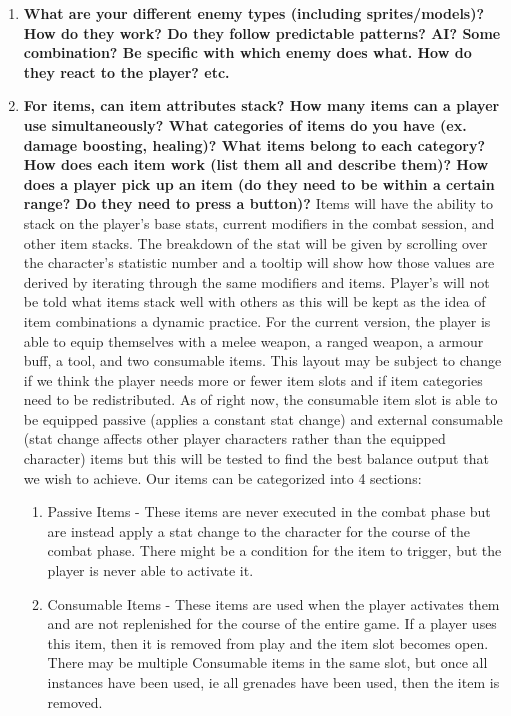 \documentclass[12pt, titlepage]{article}
\begin{document}
\begin{enumerate}
	\item \textbf{What are your different enemy types (including sprites/models)? How do they work? Do they follow predictable patterns? AI? Some combination? Be specific with which enemy does what. How do they react to the player? etc.}
	\item \textbf{For items, can item attributes stack? How many items can a player use simultaneously? What categories of items do you have (ex. damage boosting, healing)? What items belong to each category? How does each item work (list them all and describe them)? How does a player pick up an item (do they need to be within a certain range? Do they need to press a button)?}
	Items will have the ability to stack on the player's base stats, current modifiers in the combat session, and other item stacks. The breakdown of the stat will be given by scrolling over the character's statistic number and a tooltip will show how those values are derived by iterating through the same modifiers and items. Player's will not be told what items stack well with others as this will be kept as the idea of item combinations a dynamic practice.
	For the current version, the player is able to equip themselves with a melee weapon, a ranged weapon, a armour buff, a tool, and two consumable items. This layout may be subject to change if we think the player needs more or fewer item slots and if item categories need to be redistributed. As of right now, the consumable item slot is able to be equipped passive (applies a constant stat change) and external consumable (stat change affects other player characters rather than the equipped character) items but this will be tested to find the best balance output that we wish to achieve.
	Our items can be categorized into 4 sections:
	\begin{enumerate}
	\item Passive Items - These items are never executed in the combat phase but are instead apply a stat change to the character for the course of the combat phase. There might be a condition for the item to trigger, but the player is never able to activate it.
	\item Consumable Items - These items are used when the player activates them and are not replenished for the course of the entire game. If a player uses this item, then it is removed from play and the item slot becomes open. There may be multiple Consumable items in the same slot, but once all instances have been used, ie all grenades have been used, then the item is removed.

\end{enumerate}
\end{enumerate}
\end{document}
